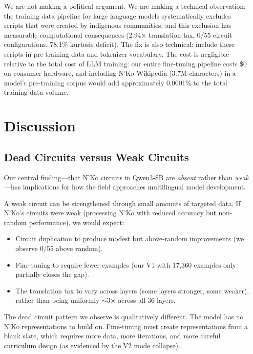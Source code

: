 \documentclass[11pt]{article}
\begin{document}
We are not making a political argument.
We are making a technical observation: the training data pipeline for large language models systematically excludes scripts that were created by indigenous communities, and this exclusion has measurable computational consequences (2.94$\times$ translation tax, 0/55 circuit configurations, 78.1\% kurtosis deficit).
The fix is also technical: include these scripts in pre-training data and tokenizer vocabulary.
The cost is negligible relative to the total cost of LLM training: our entire fine-tuning pipeline costs \$0 on consumer hardware, and including N'Ko Wikipedia (3.7M characters) in a model's pre-training corpus would add approximately 0.0001\% to the total training data volume.

\section{Discussion}

\subsection{Dead Circuits versus Weak Circuits}

Our central finding---that N'Ko circuits in Qwen3-8B are \emph{absent} rather than \emph{weak}---has implications for how the field approaches multilingual model development.

A weak circuit can be strengthened through small amounts of targeted data.
If N'Ko's circuits were weak (processing N'Ko with reduced accuracy but non-random performance), we would expect:
\begin{itemize}
\item Circuit duplication to produce modest but above-random improvements (we observe 0/55 above random).
\item Fine-tuning to require fewer examples (our V1 with 17,360 examples only partially closes the gap).
\item The translation tax to vary across layers (some layers stronger, some weaker), rather than being uniformly $\sim$3$\times$ across all 36 layers.
\end{itemize}

The dead circuit pattern we observe is qualitatively different.
The model has no N'Ko representations to build on.
Fine-tuning must create representations from a blank slate, which requires more data, more iterations, and more careful curriculum design (as evidenced by the V2 mode collapse).
\end{document}
